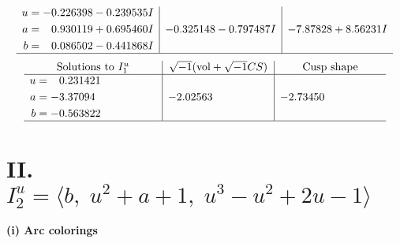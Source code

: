 \documentclass[1p]{elsarticle_modified}
\theoremstyle{definition}
\newcommand{\I}{\sqrt{-1}}
\begin{document}
$$\begin{array}{c|c|c}
\begin{aligned}
u &= -0.226398 - 0.239535 I \\
a &= \phantom{-}0.930119 + 0.695460 I \\
b &= \phantom{-}0.086502 - 0.441868 I\end{aligned}
 & -0.325148 - 0.797487 I & -7.87828 + 8.56231 I\\
 \hline 
 \end{array}$$\newpage$$\begin{array}{c|c|c}  
\text{Solutions to }I^u_{1}& \I (\text{vol} + \sqrt{-1}CS) & \text{Cusp shape}\\
 \hline 
\begin{aligned}
u &= \phantom{-}0.231421\phantom{ +0.000000I} \\
a &= -3.37094\phantom{ +0.000000I} \\
b &= -0.563822\phantom{ +0.000000I}\end{aligned}
 & -2.02563\phantom{ +0.000000I} & -2.73450\phantom{ +0.000000I}\\
 \hline 
 \end{array}$$\newpage\newpage\renewcommand{\arraystretch}{1}
\centering \section*{II. $I^u_{2}= \langle b,\;u^2+a+1,\;u^3- u^2+2 u-1 \rangle$}
\flushleft \textbf{(i) Arc colorings}\\
\end{document}
